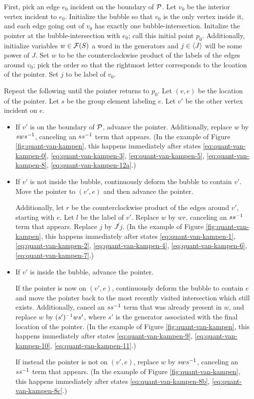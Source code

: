\begin{algorithm}\label{algorithm:quant-van-kampen}
	
First, pick an edge $e_0$ incident on the boundary of $\mathcal P$. Let $v_0$ be the interior vertex incident to $e_0$. Initialize the bubble so that $v_0$ is the only vertex inside it, and each edge going out of $v_0$ has exactly one bubble-intersection. Initalize the pointer at the bubble-intersection with $e_0$; call this initial point $p_0$. Additionally, initialize variables $w \in \mathcal F(S)$  a word in the generators and $j \in \braket J$ will be some power of $J$. Set $w$ to be the counterclockwise product of the labels of the edges around $v_0$; pick the order so that the rightmost letter corresponds to the lcoation of the pointer. Set $j$ to be label of $v_0$.

Repeat the following until the pointer returns to $p_0$.
Let $(v,e)$ be the location of the pointer. Let $s$ be the group element labeling $e$. Let $v'$ be the other vertex incident on $e$.
\begin{itemize}
	\item If $v'$ is on the boundary of $\mathcal P$, advance the pointer. Additionally, replace $w$ by $sws^{-1}$, canceling an $ss^{-1}$ term that appears. (In the example of Figure \ref{fig:quant-van-kampen}, this happens immediately after states \eqref{eq:quant-van-kampen-0}, \eqref{eq:quant-van-kampen-3}, \eqref{eq:quant-van-kampen-5}, \eqref{eq:quant-van-kampen-8}, \eqref{eq:quant-van-kampen-12a}.)
	\item If $v'$ is not inside the bubble, continuously deform the bubble to contain $v'$.
	Move the pointer to $(v',e)$ and then advance the pointer.

	Additionally, let $r$ be the counterclockwise  product of the edges around $v'$, starting with $e$. Let $l$ be the label of $v'$. Replace $w$ by $wr$, canceling an $ss^{-1}$ term that appears. Replace $j$ by $J^lj$. 
	(In the example of Figure \ref{fig:quant-van-kampen}, this happens immediately after states \eqref{eq:quant-van-kampen-1}, \eqref{eq:quant-van-kampen-2}, \eqref{eq:quant-van-kampen-4}, \eqref{eq:quant-van-kampen-6}, \eqref{eq:quant-van-kampen-7}.)
	\item If $v'$ is inside the bubble, advance the pointer. 

	If the pointer is now on $(v',e)$, continuously deform the bubble to contain $e$ and move the pointer back to the most recently visited intersection which still exists. Additionally, cancel an $ss^{-1}$ term that was already present in $w$, and replace $w$ by $(s')^{-1} ws'$, where $s'$ is the generator associated with the final location of the pointer. (In the example of Figure \ref{fig:quant-van-kampen}, this happens immediately after states \eqref{eq:quant-van-kampen-9}, \eqref{eq:quant-van-kampen-10}, \eqref{eq:quant-van-kampen-11}.)

	If instead the pointer is not on $(v',e)$, replace $w$ by $sws^{-1}$, canceling an $ss^{-1}$ term that appears. 
	(In the example of Figure \ref{fig:quant-van-kampen}, this happens immediately after states \eqref{eq:quant-van-kampen-8b}, \eqref{eq:quant-van-kampen-8c}.)
\end{itemize}
\end{algorithm}

